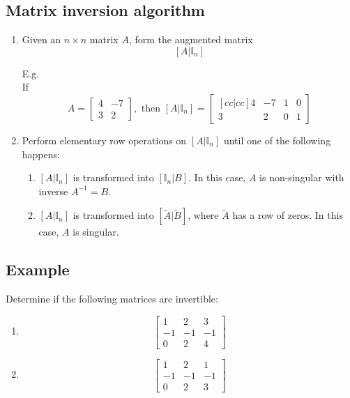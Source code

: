 \documentclass[11pt]{article}
\begin{document}
\subsection{Matrix inversion algorithm}
\begin{enumerate}[ (i) ]
\item Given an $n \times n$ matrix $A$, form the augmented matrix
\[ [A | \mathbb{I}_n ] \]

E.g.\\
If
\[ A = \begin{bmatrix}
4 & -7\\
3 & 2
\end{bmatrix}
, \text{ then } [ A | \mathbb{I}_n ]
= \begin{bmatrix}[cc|cc]
4 & -7 & 1 & 0 \\
3 & 2 & 0 & 1
\end{bmatrix}
\]

\item Perform elementary row operations on $[A | \mathbb{I}_n ]$ until one of the following happens:
\begin{enumerate}[ label=(\roman{enumi}.\alph*) ]
\item 
$[A | \mathbb{I}_n ]$ is transformed into $[\mathbb{I}_n | B ]$. In this case, $A$ is non-singular with inverse $A^{-1} = B$.
\item $[A | \mathbb{I}_n ]$ is transformed into $[\tilde{A} | \tilde{B} ]$, where $\tilde{A}$ has a row of zeros. In this case, $A$ is singular.
\end{enumerate}

\end{enumerate}

\subsection{Example}
Determine if the following matrices are invertible:
\begin{enumerate}[ (a) ]
\item
\[
\begin{bmatrix}
1 & 2 & 3\\
-1 & -1 & -1\\
0 & 2 & 4
\end{bmatrix}
\]
\item
\[
\begin{bmatrix}
1 & 2 & 1 \\
-1 & -1 & -1\\
0 & 2 & 3
\end{bmatrix}
\]
\end{enumerate}
\end{document}
